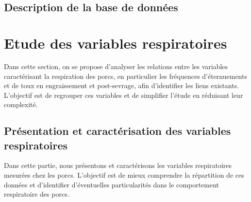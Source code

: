 \documentclass{article}
\begin{document}
\subsection{Description de la base de données}
\newpage
\section{Etude des variables respiratoires}
Dans cette section, on se propose d’analyser les relations entre les variables caractérisant la respiration des porcs, en particulier les fréquences d’éternuements et de toux en engraissement et post-sevrage, afin d’identifier les liens existants. L’objectif est de regrouper ces variables et de simplifier l’étude en réduisant leur complexité.

\subsection{Présentation et caractérisation des variables respiratoires}
Dans cette partie, nous présentons et caractérisons les variables respiratoires mesurées chez les porcs. L'objectif est de mieux comprendre la répartition de ces données et d'identifier d'éventuelles particularités dans le comportement respiratoire des porcs.
\end{document}
